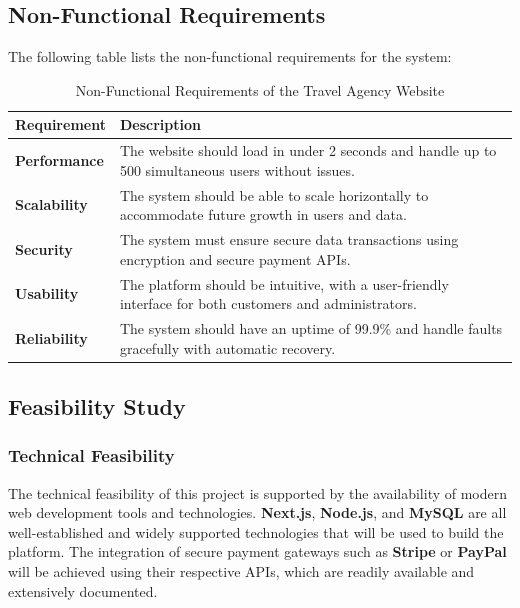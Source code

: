 \subsection{Non-Functional Requirements}
The following table lists the non-functional requirements for the system:
\begin{table}[h]
    \caption{Non-Functional Requirements of the Travel Agency Website}
    \vspace{0.2in}
    \centering
    \begin{tabular}{|>{\raggedright\arraybackslash}p{5cm}|>{\raggedright\arraybackslash}p{9cm}|}%
        \hline
        \textbf{Requirement} & \textbf{Description} \\ 
        \hline
        \textbf{Performance} & The website should load in under 2 seconds and handle up to 500 simultaneous users without issues. \\
        \hline
        \textbf{Scalability} & The system should be able to scale horizontally to accommodate future growth in users and data. \\
        \hline
        \textbf{Security} & The system must ensure secure data transactions using encryption and secure payment APIs. \\
        \hline
        \textbf{Usability} & The platform should be intuitive, with a user-friendly interface for both customers and administrators. \\
        \hline
        \textbf{Reliability} & The system should have an uptime of 99.9\% and handle faults gracefully with automatic recovery. \\
        \hline
    \end{tabular}
\end{table}

\subsection{Feasibility Study}

\subsubsection{Technical Feasibility}
The technical feasibility of this project is supported by the availability of modern web development tools and technologies. \textbf{Next.js}, \textbf{Node.js}, and \textbf{MySQL} are all well-established and widely supported technologies that will be used to build the platform. The integration of secure payment gateways such as \textbf{Stripe} or \textbf{PayPal} will be achieved using their respective APIs, which are readily available and extensively documented.

